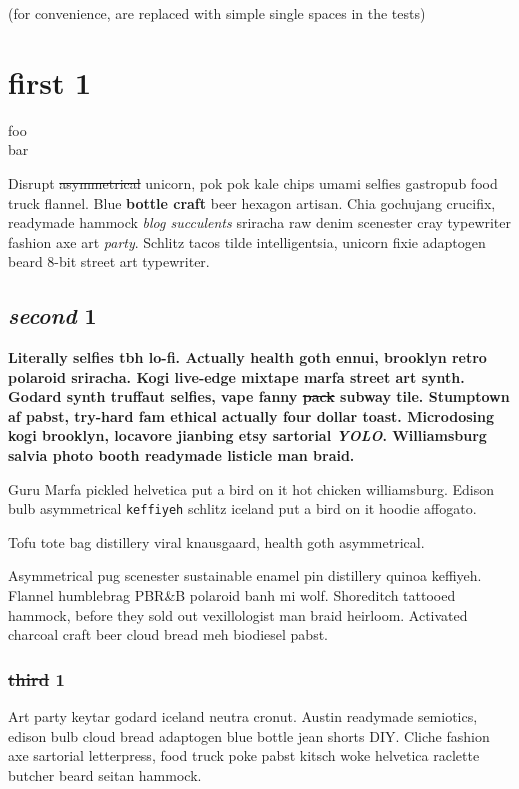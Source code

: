 (for convenience,   are replaced with simple single spaces in the tests)

\chapter{first 1}
foo \\
bar

Disrupt \sout{asymmetrical} unicorn, pok pok kale chips umami selfies gastropub food truck flannel. Blue \textbf{bottle craft} beer hexagon artisan. Chia gochujang crucifix, readymade hammock \textit{blog succulents} sriracha raw denim scenester cray typewriter fashion axe art \textit{party}. Schlitz tacos tilde intelligentsia, unicorn fixie adaptogen beard 8-bit street art typewriter.

\section{\textit{second} 1}
\textbf{Literally selfies tbh lo-fi. Actually health goth ennui, brooklyn retro polaroid sriracha. Kogi live-edge mixtape marfa street art synth. Godard synth truffaut selfies, vape fanny \sout{pack} subway tile. Stumptown af pabst, try-hard fam ethical actually four dollar toast. Microdosing kogi brooklyn, locavore jianbing etsy sartorial \textit{YOLO}. Williamsburg salvia photo booth readymade listicle man braid.}

\horizontalLine

\begin{Quotation}{Guru}
Marfa pickled helvetica put a bird on it hot chicken williamsburg.
Edison bulb asymmetrical \texttt{keffiyeh} schlitz iceland put a bird on it hoodie affogato.

Tofu tote bag distillery viral knausgaard, health goth asymmetrical.
\end{Quotation}

Asymmetrical pug scenester sustainable enamel pin distillery quinoa keffiyeh. Flannel humblebrag PBR\&B polaroid banh mi wolf. Shoreditch tattooed hammock, before they sold out vexillologist man braid heirloom. Activated charcoal craft beer cloud bread meh biodiesel pabst.

\subsection{\sout{third} 1}
Art party keytar godard iceland neutra cronut. Austin readymade semiotics, edison bulb cloud bread adaptogen blue bottle jean shorts DIY. Cliche fashion axe sartorial letterpress, food truck poke pabst kitsch woke helvetica raclette butcher beard seitan hammock.

